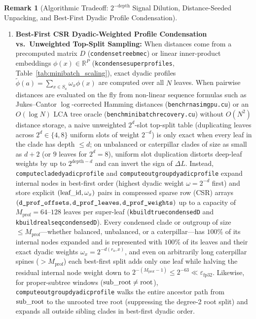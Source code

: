 \documentclass[11pt,a4paper]{article}
\makeatletter
\DeclareRobustCommand{\_}{\ifmmode\nfss@text{\textunderscore}\else\textunderscore\allowbreak\fi}
\theoremstyle{definition}
\newtheorem{remark}[theorem]{Remark}
\makeatother
\begin{document}
\begin{remark}[Algorithmic Tradeoff: $2^{-\text{depth}}$ Signal Dilution, Distance-Seeded Unpacking, and Best-First Dyadic Profile Condensation]
\begin{enumerate}
    \item \textbf{Best-First CSR Dyadic-Weighted Profile Condensation vs.\ Unweighted Top-Split Sampling:} When distances come from a precomputed matrix $D$ (\texttt{condense\_tree\_bme\_c}) or linear inner-product embeddings $\phi(x) \in \mathbb{R}^P$ (\texttt{k\_condense\_super\_profiles}, Table~\ref{tab:minibatch_scaling}), exact dyadic profiles $\widetilde{\phi}(a) = \sum_{x \in S_a} \omega_x \phi(x)$ are computed over all $N$ leaves. When pairwise distances are evaluated on the fly from non-linear sequence formulas such as Jukes--Cantor $\log$-corrected Hamming distances (\texttt{bench\_rnasim\_gpu.cu}) or an $O(\log N)$ LCA tree oracle (\texttt{bench\_minibatch\_recovery.cu}) without $O(N^2)$ distance storage, a naive unweighted $2^d$-slot top-split table (duplicating leaves across $2^d \in \{4, 8\}$ uniform slots of weight $2^{-d}$) is only exact when every leaf in the clade has depth $\le d$; on unbalanced or caterpillar clades of size as small as $d + 2$ (or $9$ leaves for $2^d = 8$), uniform slot duplication distorts deep-leaf weights by up to $2^{\text{depth}-d}$ and can invert the sign of $\Delta L$. Instead, \texttt{compute\_clade\_dyadic\_profile} and \texttt{compute\_outgroup\_dyadic\_profile} expand internal nodes in best-first order (highest dyadic weight $\omega = 2^{-d}$ first) and store explicit $(\text{leaf\_id}, \omega_x)$ pairs in compressed sparse row (CSR) arrays $(\texttt{d\_prof\_offsets}, \texttt{d\_prof\_leaves}, \texttt{d\_prof\_weights})$ up to a capacity of $M_{\text{prof}} = 64\text{--}128$ leaves per super-leaf (\texttt{k\_build\_true\_condensed\_D} and \texttt{k\_build\_real\_seq\_condensed\_D}). Every condensed clade or outgroup of size $\le M_{\text{prof}}$---whether balanced, unbalanced, or a caterpillar---has $100\%$ of its internal nodes expanded and is represented with $100\%$ of its leaves and their exact dyadic weights $\omega_x = 2^{-d(r_a, x)}$, and even on arbitrarily long caterpillar spines ($> M_{\text{prof}}$) each best-first split adds only one leaf while halving the residual internal node weight down to $2^{-(M_{\text{prof}}-1)} \le 2^{-63} \ll \varepsilon_{\text{fp32}}$. Likewise, for proper-subtree windows ($\text{sub\_root} \neq \text{root}$), \texttt{compute\_outgroup\_dyadic\_profile} walks the entire ancestor path from $\text{sub\_root}$ to the unrooted tree root (suppressing the degree-2 root split) and expands all outside sibling clades in best-first dyadic order.
\end{enumerate}
\end{remark}
\end{document}
